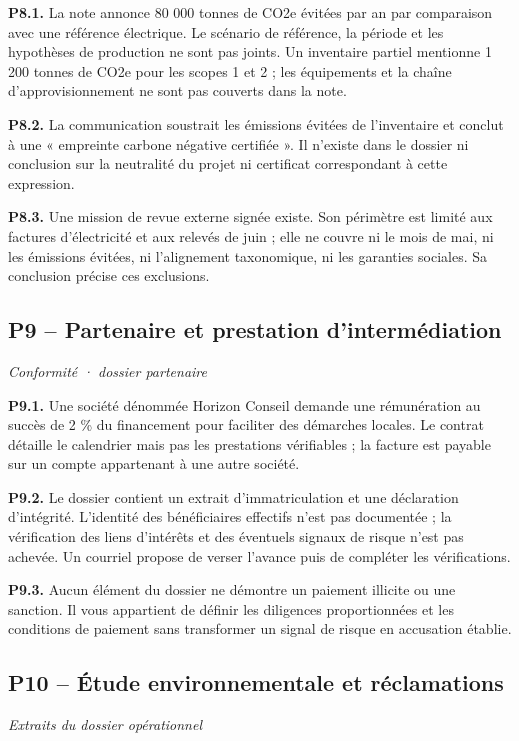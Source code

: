 \documentclass[11pt,a4paper]{article}
\begin{document}
\textbf{P8.1.} La note annonce 80 000 tonnes de CO2e évitées par an par comparaison avec une référence électrique. Le scénario de référence, la période et les hypothèses de production ne sont pas joints. Un inventaire partiel mentionne 1 200 tonnes de CO2e pour les scopes 1 et 2 ; les équipements et la chaîne d’approvisionnement ne sont pas couverts dans la note.

\textbf{P8.2.} La communication soustrait les émissions évitées de l’inventaire et conclut à une « empreinte carbone négative certifiée ». Il n’existe dans le dossier ni conclusion sur la neutralité du projet ni certificat correspondant à cette expression.

\textbf{P8.3.} Une mission de revue externe signée existe. Son périmètre est limité aux factures d’électricité et aux relevés de juin ; elle ne couvre ni le mois de mai, ni les émissions évitées, ni l’alignement taxonomique, ni les garanties sociales. Sa conclusion précise ces exclusions.

\subsection{P9 -- Partenaire et prestation d’intermédiation}
\textit{Conformité · dossier partenaire}

\textbf{P9.1.} Une société dénommée Horizon Conseil demande une rémunération au succès de 2 \% du financement pour faciliter des démarches locales. Le contrat détaille le calendrier mais pas les prestations vérifiables ; la facture est payable sur un compte appartenant à une autre société.

\textbf{P9.2.} Le dossier contient un extrait d’immatriculation et une déclaration d’intégrité. L’identité des bénéficiaires effectifs n’est pas documentée ; la vérification des liens d’intérêts et des éventuels signaux de risque n’est pas achevée. Un courriel propose de verser l’avance puis de compléter les vérifications.

\textbf{P9.3.} Aucun élément du dossier ne démontre un paiement illicite ou une sanction. Il vous appartient de définir les diligences proportionnées et les conditions de paiement sans transformer un signal de risque en accusation établie.

\subsection{P10 -- Étude environnementale et réclamations}
\textit{Extraits du dossier opérationnel}
\end{document}
